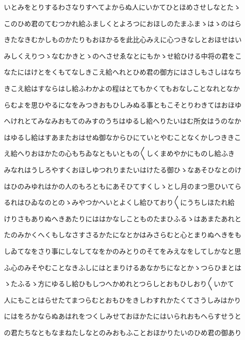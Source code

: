 \documentclass[a4paper,11pt,landscape]{ltjtarticle}
\begin{document}
\par\medskip
いとみをとりするわさなりすへてよからぬ人にいかてひとほめさせしなとたゝ
\par\medskip
このひめ君のてむつかれ給ふましくとよろつにおほしのたまふまゝはゝのはら
\par\medskip
きたなきむかしものかたりもおほかるを此比心みえに心つきなしとおほせはい
\par\medskip
みしくえりつゝなむかきとゝのへさせゑなとにもかゝせ給ひける中将の君をこ
\par\medskip
なたにはけとをくもてなしきこえ給へれとひめ君の御方にはさしもさしはなち
\par\medskip
きこえ給はすならはし給ふわかよの程はとてもかくてもおなしことなれとなか
\par\medskip
らむよを思ひやるになをみつきおもひしみぬる事ともこそとりわきてはおほゆ
\par\medskip
へけれとてみなみおもてのみすのうちはゆるし給へりたいはむ所女はうのなか
\par\medskip
はゆるし給はすあまたおはせぬ御なからひにていとやむことなくかしつききこ
\par\medskip
え給へりおほかたの心もちゐなともいともの〱しくまめやかにものし給ふき
\par\medskip
みなれはうしろやすくおほしゆつれりまたいはけたる御ひゝなあそひなとのけ
\par\medskip
はひのみゆれはかの人のもろともにあそひてすくしゝとし月のまつ思ひいてら
\par\medskip
るれはひゐなのとのゝみやつかへいとよくし給ひており〱にうちしほたれ給
\par\medskip
けりさもありぬへきあたりにははかなしことものたまひふるゝはあまたあれと
\par\medskip
たのみかくへくもしなさすさるかたになとかはみさらむと心とまりぬへきをも
\par\medskip
しゐてなをさり事にしなしてなをかのみとりのそてをみえなをしてしかなと思
\par\medskip
ふ心のみそやむことなきふしにはとまりけるあなかちになとかゝつらひまとは
\par\medskip
ゝたふるゝ方にゆるし給ひもしつへかめれとつらしとおもひしおり〱いかて
\par\medskip
人にもことはらせたてまつらむとおもひをきしわすれかたくてさうしみはかり
\par\medskip
にはをろかならぬあはれをつくしみせておほかたにはいられおもへらすせうと
\par\medskip
の君たちなともなまねたしなとのみおもふことおほかりたいのひめ君の御あり
\par\medskip
\end{document}
